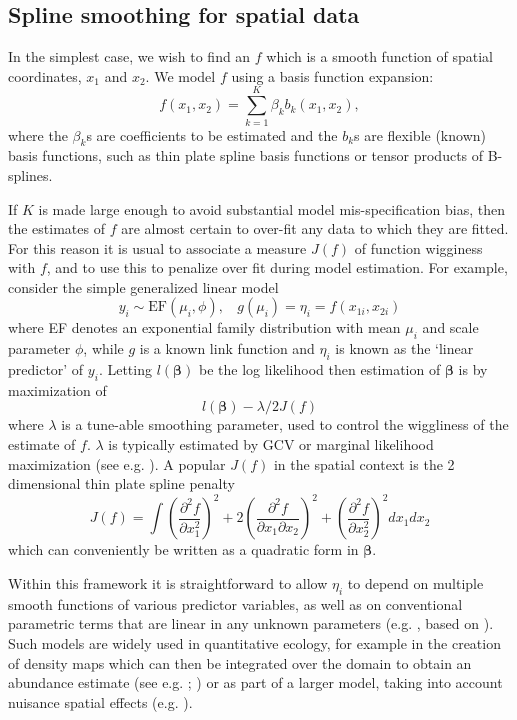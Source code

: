 \documentclass[smallextended]{svjour3}       %
\newcommand{\pdif}[2]{\frac{\partial #1}{\partial #2}}
\newcommand{\pddif}[3]{\frac{\partial^2 #1}{\partial #2 \partial #3}}
\begin{document}
\subsection{Spline smoothing for spatial data}

In the simplest case, we wish to find an $f$ which is a smooth function of spatial coordinates, $x_1$ and $x_2$. We model $f$ using a basis function expansion:
\begin{equation}
f(x_{1}, x_{2}) = \sum_{k=1}^K \beta_k b_k(x_{1}, x_{2}),
\label{basis-exp}
\end{equation}
where the $\beta_k$s are coefficients to be estimated and the $b_k$s are flexible (known) basis functions, such as thin plate spline basis functions or tensor products of B-splines. 

If $K$ is made large enough to avoid substantial model mis-specification bias, then the estimates of $f$ are almost certain to over-fit any data to which they are fitted. For this reason it is usual to associate a measure $J(f)$ of function wigginess with $f$, and to use this to penalize over fit during model estimation. 
For example, consider the simple generalized linear model  
$$
y_i \sim \text{EF}(\mu_i, \phi),~~~~ g(\mu_i) = \eta_i =f(x_{1i},x_{2i})
$$
where EF denotes an exponential family distribution with mean $\mu_i$ and scale parameter $\phi$, while $g$ is a known link function and $\eta_i$ is known as the `linear predictor' of $y_i$. Letting $l({\bm \beta})$ be the log likelihood then estimation of $\bm \beta$ is by maximization of 
$$
l({\bm \beta}) - \lambda/2 J(f)
$$ 
where $\lambda$ is a tune-able smoothing parameter, used to control the wiggliness of the estimate of $f$. $\lambda $ is typically estimated by GCV or marginal likelihood maximization (see e.g. \cite{Wood:ub}). A popular $J(f)$ in the spatial context is the 2 dimensional thin plate spline penalty
$$
J(f) = \int \left (\pdif{^2 f}{x_1^2}\right )^2 + 2\left ( \pddif{f}{x_1}{x_2}\right )^2 + \left (\pdif{^2 f}{x_2^2}\right )^2 dx_1 dx_2
$$
which can conveniently be written as a quadratic form in $\bm \beta$. 

Within this framework it is straightforward to allow $\eta_i$ to depend on multiple smooth functions of various predictor variables, as well as on conventional parametric terms that are linear in any unknown parameters (e.g. \cite{Wood:2006wz}, based on \cite{hastie1990generalized}). Such models are widely used in quantitative ecology, for example in the creation of density maps which can then be integrated over the domain to obtain an abundance estimate (see e.g.  \cite{Hedley:2004et}; \cite{WILLIAMS:2011in}) or as part of a larger model, taking into account nuisance spatial effects (e.g. \cite{Augustin:2009ui}). 
\end{document}
